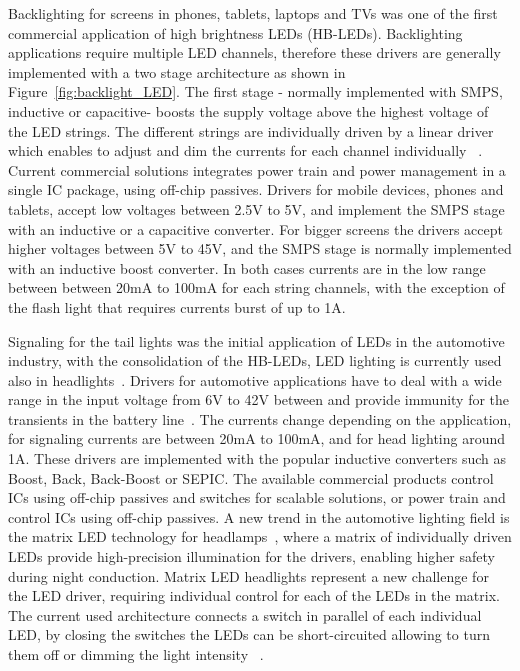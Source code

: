 Backlighting for screens in phones, tablets, laptops and TVs was one of the first commercial application of high brightness LEDs (HB-LEDs). Backlighting applications require multiple LED channels, therefore these drivers are generally implemented with a two stage architecture as shown in Figure~\ref{fig:backlight_LED}. The first stage - normally implemented with SMPS, inductive or capacitive-  boosts the supply voltage above the highest voltage of the LED strings. The different strings are individually driven by a linear driver which enables to adjust and dim the currents for each channel individually ~\cite{2008Yuequan,07Feng}. Current commercial solutions integrates power train and power management in a single IC package, using off-chip passives. Drivers for mobile devices, phones and tablets, accept low voltages between 2.5V to 5V, and implement the SMPS stage with an inductive or a capacitive converter. For bigger screens the drivers accept higher voltages between 5V to 45V, and the SMPS stage is normally implemented with an inductive boost converter. In both cases currents are in the low range between between 20mA to 100mA for each string channels, with the exception of the flash light that requires currents burst of up to 1A.

Signaling for the tail lights was the initial application of LEDs in the automotive industry, with the consolidation of the HB-LEDs, LED lighting is currently used also in headlights~\cite{2008Gacio}. Drivers for automotive applications have to deal with a wide range in the input voltage  from 6V to 42V between and provide immunity for the transients in the battery line~\cite{2005mednik,2012Saponara}. The currents change depending on the application, for signaling currents are between 20mA to 100mA, and for head lighting around 1A.  These drivers are implemented  with the popular inductive converters such as Boost, Back, Back-Boost or SEPIC. The available commercial products control ICs using off-chip passives and switches for scalable solutions, or power train and control ICs using off-chip passives. A new trend in the automotive lighting field is the matrix LED technology for headlamps~\cite{web:AUDI_MATRIX}, where a matrix of individually driven LEDs provide high-precision illumination for the drivers, enabling higher safety during night conduction. Matrix LED headlights represent a new challenge for the LED driver, requiring individual control for each of the LEDs in the matrix. The current used architecture connects a switch in parallel of each individual LED, by closing the switches the LEDs can be short-circuited allowing to turn them off or dimming the light intensity ~\cite{2014DS_TI:LED_Matrix_Manger}.

